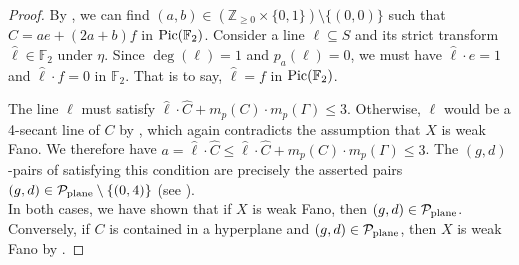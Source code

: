 \documentclass[english,11pt,reqno]{amsart}
\newcommand{\sub}{\subseteq}
\newcommand{\Z}{\mathbb{Z}}
\newcommand{\Pic}{\textup{Pic}}
\newcommand{\Ftwo}{\mathbb{F}_2}
\begin{document}
\begin{proof}
\par 
By , we can find $(a,b)\in \left(\Z_{\geq 0} \times \{0,1\}\right) \setminus \{(0,0)\}$ such that $\hat{C} = a e + (2a+b)f$ in $\Pic(\Ftwo)$. Consider a line $\ell\sub S$ and its strict transform $\hat{\ell}\in \Ftwo$ under $\eta$. Since $\deg(\ell)=1$ and $p_a(\ell)=0$, we must have $\hat{\ell} \cdot e=1$ and $\hat{\ell} \cdot f=0$ in $\Ftwo$. That is to say, $\hat{\ell} =f$ in $\Pic(\Ftwo)$. \par
The line $\ell$ must satisfy $\hat{\ell}\cdot \hat{C} + m_p(C)\cdot m_p(\Gamma )\leq 3$. Otherwise, $\ell$ would be a 4-secant line of $C$ by , which again contradicts the assumption that $X$ is weak Fano. We therefore have $a= \hat{\ell}\cdot \hat{C} \leq \hat{\ell}\cdot \hat{C} + m_p(C)\cdot m_p(\Gamma )\leq 3$. The $(g,d)$-pairs of  satisfying this condition are precisely the asserted pairs $(g,d)\in\mathcal{P}_{\textup{plane}}\setminus \{(0,4)\}$ (see ).\\
In both cases, we have shown that if $X$ is weak Fano, then $ (g,d) \in \mathcal{P}_{\textup{plane}}$. Conversely, if $C$ is contained in a hyperplane and $(g,d)\in \mathcal{P}_{\textup{plane}}$, then $X$ is weak Fano by .
\end{proof}
%
%
%
%
%
%
%
\end{document}
